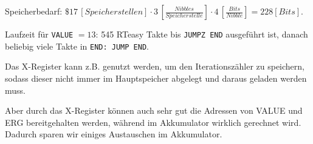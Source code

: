 \documentclass{CInf_practice}
\begin{document}


Speicherbedarf: $\$17\, \left[Speicherstellen\right] \cdot 3\, \left[\frac{Nibbles}{Speicherstelle}\right] \cdot 4\, \left[\frac{Bits}{Nibble}\right] = 228 \left[Bits\right]$.

Laufzeit für \texttt{VALUE} $=13$: 545 RTeasy Takte bis \texttt{JUMPZ END} ausgeführt ist, danach beliebig viele Takte in \texttt{END: JUMP END}. 

\newpage
{}
Das X-Register kann z.B. genutzt werden, um den Iterationszähler zu speichern,
sodass dieser nicht immer im Hauptspeicher abgelegt und daraus geladen werden
muss.

Aber durch das X-Register können auch sehr gut die Adressen von VALUE und ERG 
bereitgehalten werden, während im Akkumulator wirklich gerechnet wird. 
Dadurch sparen wir einiges Austauschen im Akkumulator.
\end{document}
